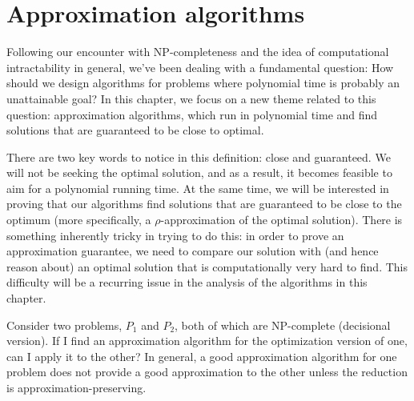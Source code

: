 \section{Approximation algorithms}\label{ch3}
Following our encounter with NP-completeness and the idea of computational intractability in general, we’ve been dealing with a fundamental question: How should we design algorithms for problems where polynomial time is probably an unattainable goal? In this chapter, we focus on a new theme related to this question: approximation algorithms, which run in polynomial time and find solutions that are guaranteed to be close to optimal. 

There are two key words to notice in this definition: close and guaranteed. We will not be seeking the optimal solution, and as a result, it becomes feasible to aim for a polynomial running time. At the same time, we will be interested in proving that our algorithms find solutions that are guaranteed to be close to the optimum (more specifically, a $\rho$-approximation of the optimal solution). There is something inherently tricky in trying to do this: in order to prove an approximation guarantee, we need to compare our solution with (and hence reason about) an optimal solution that is computationally very hard to find. This difficulty will be a recurring issue in the analysis of the algorithms in this chapter.


Consider two problems, $P_1$ and $P_2$, both of which are NP-complete (decisional version). If I find an approximation algorithm for the optimization version of one, can I apply it to the other? In general, a good approximation algorithm for one problem does not provide a good approximation to the other unless the reduction is approximation-preserving.


